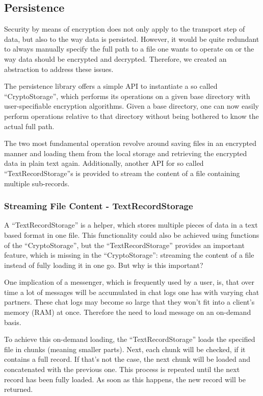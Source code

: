 \subsection{Persistence}\label{subsec:persistence}
Security by means of encryption does not only apply to the transport step of data, but also to the way data is persisted.
However, it would be quite redundant to always manually specify the full path to a file one wants to operate on or the way data should be encrypted and decrypted.
Therefore, we created an abstraction to address these issues.

The persistence library offers a simple API to instantiate a so called \enquote{CryptoStorage}, which performs its operations on a given base directory with user-specifiable encryption algorithms.
Given a base directory, one can now easily perform operations relative to that directory without being bothered to know the actual full path.

The two most fundamental operation revolve around saving files in an encrypted manner and loading them from the local storage and retrieving the encrypted data in plain text again.
Additionally, another API for so called \enquote{TextRecordStorage}s is provided to stream the content of a file containing multiple sub-records.

\subsubsection{Streaming File Content - TextRecordStorage}
A \enquote{TextRecordStorage} is a helper, which stores multiple pieces of data in a text based format in one file.
This functionality could also be achieved using functions of the \enquote{CryptoStorage}, but the \enquote{TextRecordStorage} provides an important feature, which is missing in the \enquote{CryptoStorage}: streaming the content of a file instead of fully loading it in one go.
But why is this important?

One implication of a messenger, which is frequently used by a user, is, that over time a lot of messages will be accumulated in chat logs one has with varying chat partners.
These chat logs may become so large that they won't fit into a client's memory (RAM) at once.
Therefore the need to load message on an on-demand basis.

To achieve this on-demand loading, the \enquote{TextRecordStorage} loads the specified file in chunks (meaning smaller parts).
Next, each chunk will be checked, if it contains a full record.
If that's not the case, the next chunk will be loaded and concatenated with the previous one.
This process is repeated until the next record has been fully loaded.
As soon as this happens, the new record will be returned.

